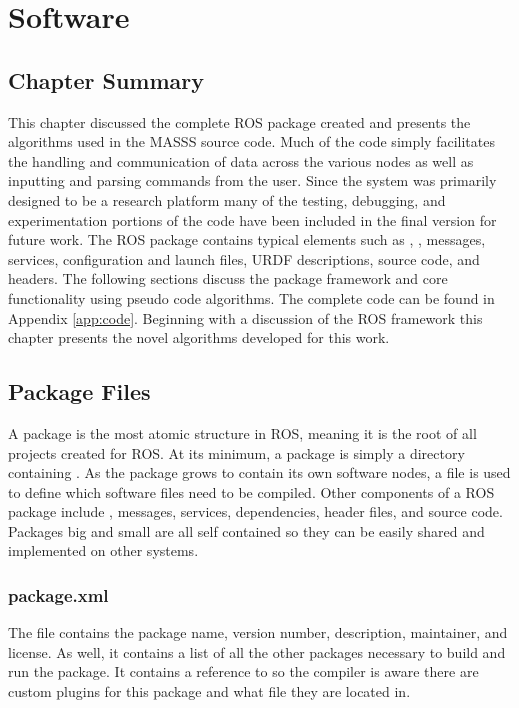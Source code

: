 \chapter{Software}
\label{chap:code}
\section{Chapter Summary}
This chapter discussed the complete ROS package created and presents the algorithms used in the MASSS source code. Much of the code simply facilitates the handling and communication of data across the various nodes as well as inputting and parsing commands from the user. Since the system was primarily designed to be a research platform many of the testing, debugging, and experimentation portions of the code have been included in the final version for future work. The ROS package contains typical elements such as , , messages, services, configuration and launch files, URDF descriptions, source code, and headers. The following sections discuss the package framework and core functionality using pseudo code algorithms. The complete code can be found in Appendix \ref{app:code}. Beginning with a discussion of the ROS framework this chapter presents the novel algorithms developed for this work.\\
\section{Package Files}

A package is the most atomic structure in ROS, meaning it is the root of all projects created for ROS. At its minimum, a package is simply a directory containing . As the package grows to contain its own software nodes, a  file is used to define which software files need to be compiled. Other components of a ROS package include , messages, services, dependencies, header files, and source code. Packages big and small are all self contained so they can be easily shared and implemented on other systems.\\

\subsection{package.xml}
The file  contains the package name, version number, description, maintainer, and license. As well, it contains a list of all the other packages necessary to build and run the package. It contains a reference to  so the compiler is aware there are custom plugins for this package and what file they are located in.\\
